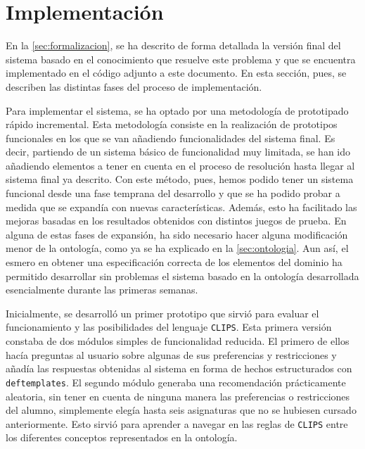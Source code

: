 
\section{Implementación} \label{sec:implementacion}

En la \autoref{sec:formalizacion}, se ha descrito de forma detallada la 
versión final del sistema basado en el conocimiento que resuelve este problema 
y que se encuentra implementado en el código adjunto a este documento. En esta 
sección, pues, se describen las distintas fases del proceso de implementación.

Para implementar el sistema, se ha optado por una metodología de prototipado 
rápido incremental. Esta metodología consiste en la realización de prototipos 
funcionales en los que se van añadiendo funcionalidades del sistema final. Es 
decir, partiendo de un sistema básico de funcionalidad muy limitada, se han 
ido añadiendo elementos a tener en cuenta en el proceso de resolución hasta 
llegar al sistema final ya descrito. Con este método, pues, hemos podido tener 
un sistema funcional desde una fase temprana del desarrollo y que se ha podido 
probar a medida que se expandía con nuevas características. Además, esto ha 
facilitado las mejoras basadas en los resultados obtenidos con distintos 
juegos de prueba. En alguna de estas fases de expansión, ha sido necesario 
hacer alguna modificación menor de la ontología, como ya se ha explicado en la 
\autoref{sec:ontologia}. Aun así, el esmero en obtener una especificación 
correcta de los elementos del dominio ha permitido desarrollar sin problemas 
el sistema basado en la ontología desarrollada esencialmente durante las 
primeras semanas.

Inicialmente, se desarrolló un primer prototipo que sirvió para evaluar el 
funcionamiento y las posibilidades del lenguaje \texttt{CLIPS}. Esta primera 
versión constaba de dos módulos simples de funcionalidad reducida. El primero
de ellos hacía preguntas al usuario sobre algunas de sus preferencias y 
restricciones y añadía las respuestas obtenidas al sistema en forma de hechos 
estructurados con \texttt{deftemplates}. El segundo módulo generaba una 
recomendación prácticamente aleatoria, sin tener en cuenta de ninguna manera 
las preferencias o restricciones del alumno, simplemente elegía hasta seis 
asignaturas que no se hubiesen cursado anteriormente. Esto sirvió para 
aprender a navegar en las reglas de \texttt{CLIPS} entre los diferentes 
conceptos representados en la ontología.



\clearpage

